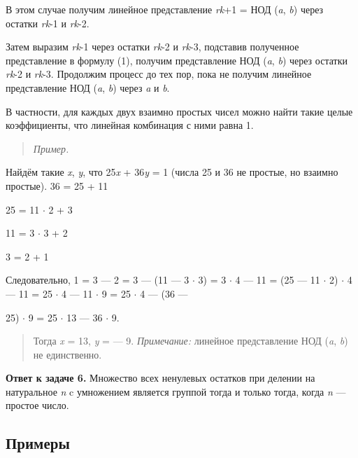\documentclass[12pt]{article}
\begin{document}
    В этом случае получим линейное представление \emph{rk}+1 = НОД
    (\emph{a}, \emph{b}) через остатки \emph{rk}-1 и \emph{rk}-2.

    Затем выразим \emph{rk}-1 через остатки \emph{rk}-2 и \emph{rk}-3,
    подставив полученное представление в формулу (1), получим представление
    НОД (\emph{a}, \emph{b}) через остатки \emph{rk}-2 и \emph{rk}-3.
    Продолжим процесс до тех пор, пока не получим линейное представление НОД
    (\emph{a}, \emph{b}) через \emph{a} и \emph{b}.

    В частности, для каждых двух взаимно простых чисел можно найти такие
    целые коэффициенты, что линейная комбинация с ними равна 1.

    \begin{quote}
        \emph{Пример.}
    \end{quote}

    Найдём такие \emph{x}, \emph{y}, что 25\emph{x} + 36\emph{y} = 1 (числа
    25 и 36 не простые, но взаимно простые). 36 = 25 + 11

    25 = 11 $\cdot$ 2 + 3

    11 = 3 $\cdot$ 3 + 2

    3 = 2 + 1

    Следовательно, 1 = 3 --- 2 = 3 --- (11 --- 3 $\cdot$ 3) = 3 $\cdot$ 4 --- 11 = (25 --- 11
$\cdot$ 2) $\cdot$ 4 --- 11 = 25 $\cdot$ 4 --- 11 $\cdot$ 9 = 25 $\cdot$ 4 --- (36 ---

    25) $\cdot$ 9 = 25 $\cdot$ 13 --- 36 $\cdot$ 9.

    \begin{quote}
        Тогда \emph{x} = 13, \emph{y} = --- 9. \emph{Примечание:} линейное
        представление НОД (\emph{a}, \emph{b}) не единственно.
    \end{quote}

    \textbf{Ответ к задаче 6.} Множество всех ненулевых остатков при делении
    на натуральное \emph{n} c умножением является группой тогда и только
    тогда, когда \emph{n} --- простое число.

    \subsection{Примеры}
\end{document}
